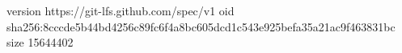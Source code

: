 version https://git-lfs.github.com/spec/v1
oid sha256:8cccde5b44bd4256c89fc6f4a8bc605dcd1c543e925befa35a21ac9f463831bc
size 15644402
